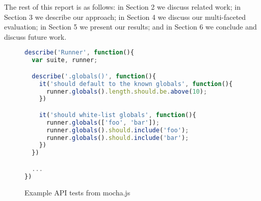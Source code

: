 The rest of this report is as follows: in Section 2 we discuss related
work; in Section 3 we describe our approach; in Section 4 we discuss
our multi-faceted evaluation; in Section 5 we present our results; and
in Section 6 we conclude and discuss future work.

%
%
%
%

%

\begin{figure*}
\begin{lstlisting}[language=javascript]
describe('Runner', function(){
  var suite, runner;

  describe('.globals()', function(){
    it('should default to the known globals', function(){
      runner.globals().length.should.be.above(10);
    })

    it('should white-list globals', function(){
      runner.globals(['foo', 'bar']);
      runner.globals().should.include('foo');
      runner.globals().should.include('bar');
    })
  })

  ...
})
\end{lstlisting}

\caption{Example API tests from mocha.js}
\end{figure*}